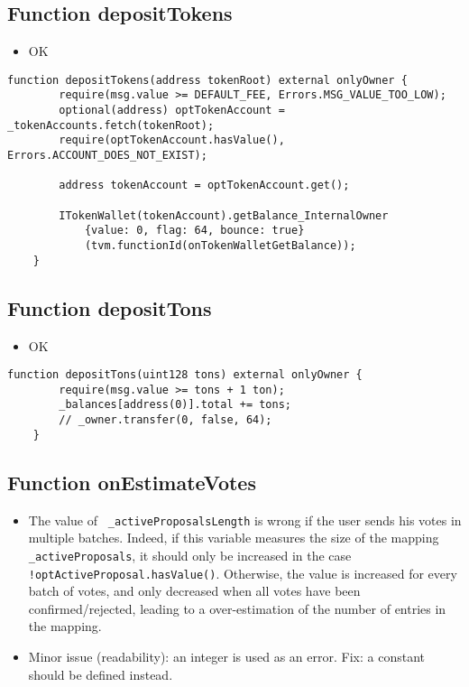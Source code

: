 \subsection{Function depositTokens}

\begin{itemize}
\item OK
\end{itemize}

\begin{lstlisting}[firstnumber=210]
    function depositTokens(address tokenRoot) external onlyOwner {
        require(msg.value >= DEFAULT_FEE, Errors.MSG_VALUE_TOO_LOW);
        optional(address) optTokenAccount = _tokenAccounts.fetch(tokenRoot);
        require(optTokenAccount.hasValue(), Errors.ACCOUNT_DOES_NOT_EXIST);

        address tokenAccount = optTokenAccount.get();

        ITokenWallet(tokenAccount).getBalance_InternalOwner
            {value: 0, flag: 64, bounce: true}
            (tvm.functionId(onTokenWalletGetBalance));
    }
\end{lstlisting}

\subsection{Function depositTons}

\begin{itemize}
\item OK
\end{itemize}

\begin{lstlisting}[firstnumber=204]
    function depositTons(uint128 tons) external onlyOwner {
        require(msg.value >= tons + 1 ton);
        _balances[address(0)].total += tons;
        // _owner.transfer(0, false, 64);
    }
\end{lstlisting}

\subsection{Function onEstimateVotes}

\begin{itemize}
\item {} {The value of {\tt
    \_activeProposalsLength} is wrong if the user sends his votes in
  multiple batches. Indeed, if this variable measures the size of the
  mapping {\tt \_activeProposals}, it should only be increased in the
  case {\tt !optActiveProposal.hasValue()}. Otherwise, the value is
  increased for every batch of votes, and only decreased when all
  votes have been confirmed/rejected, leading to a over-estimation of
  the number of entries in the mapping.}
\item Minor issue (readability): an integer is used as an error. Fix:
  a constant should be defined instead.
\end{itemize}

